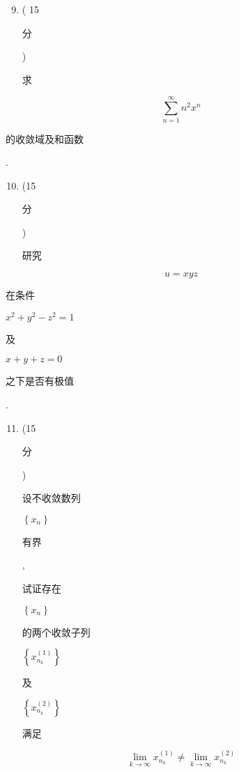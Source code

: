 \documentclass[10pt]{article}
\begin{document}
\begin{enumerate}
  \setcounter{enumi}{8}
  \item ( 15 \begin{CJK}{UTF8}{mj}分\end{CJK}) \begin{CJK}{UTF8}{mj}求\end{CJK}
\end{enumerate}
$$
\sum_{n=1}^{\infty} n^{2} x^{n}
$$
\begin{CJK}{UTF8}{mj}的收敛域及和函数\end{CJK}.

\begin{enumerate}
  \setcounter{enumi}{9}
  \item (15 \begin{CJK}{UTF8}{mj}分\end{CJK}) \begin{CJK}{UTF8}{mj}研究\end{CJK}
\end{enumerate}
$$
u=x y z
$$
\begin{CJK}{UTF8}{mj}在条件\end{CJK} $x^{2}+y^{2}-z^{2}=1$ \begin{CJK}{UTF8}{mj}及\end{CJK} $x+y+z=0$ \begin{CJK}{UTF8}{mj}之下是否有极值\end{CJK}.

\begin{enumerate}
  \setcounter{enumi}{10}
  \item (15 \begin{CJK}{UTF8}{mj}分\end{CJK}) \begin{CJK}{UTF8}{mj}设不收敛数列\end{CJK} $\left\{x_{n}\right\}$ \begin{CJK}{UTF8}{mj}有界\end{CJK}, \begin{CJK}{UTF8}{mj}试证存在\end{CJK} $\left\{x_{n}\right\}$ \begin{CJK}{UTF8}{mj}的两个收敛子列\end{CJK} $\left\{x_{n_{k}}^{(1)}\right\}$ \begin{CJK}{UTF8}{mj}及\end{CJK} $\left\{x_{n_{k}}^{(2)}\right\}$ \begin{CJK}{UTF8}{mj}满足\end{CJK}
\end{enumerate}
$$
\lim _{k \rightarrow \infty} x_{n_{k}}^{(1)} \neq \lim _{k \rightarrow \infty} x_{n_{k}}^{(2)}
$$
\end{document}

